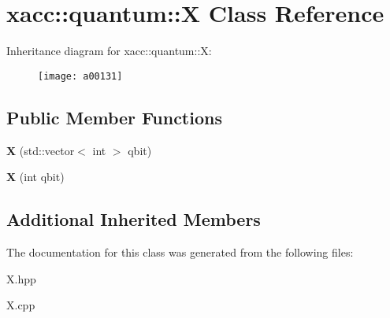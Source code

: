 \hypertarget{a00131}{}\section{xacc\+:\+:quantum\+:\+:X Class Reference}
\label{a00131}
Inheritance diagram for xacc\+:\+:quantum\+:\+:X\+:\begin{figure}[H]
\begin{center}
\leavevmode
\texttt{[image: a00131]}
\end{center}
\end{figure}
\subsection*{Public Member Functions}
\begin{DoxyCompactItemize}
\item 
{\bfseries X} (std\+::vector$<$ int $>$ qbit)\hypertarget{a00131_aedc541a302602154847118f73b040510}{}\label{a00131_aedc541a302602154847118f73b040510}

\item 
{\bfseries X} (int qbit)\hypertarget{a00131_a1159bd01929b59277b4524ccfcfd7440}{}\label{a00131_a1159bd01929b59277b4524ccfcfd7440}

\end{DoxyCompactItemize}
\subsection*{Additional Inherited Members}


The documentation for this class was generated from the following files\+:\begin{DoxyCompactItemize}
\item 
X.\+hpp\item 
X.\+cpp\end{DoxyCompactItemize}
